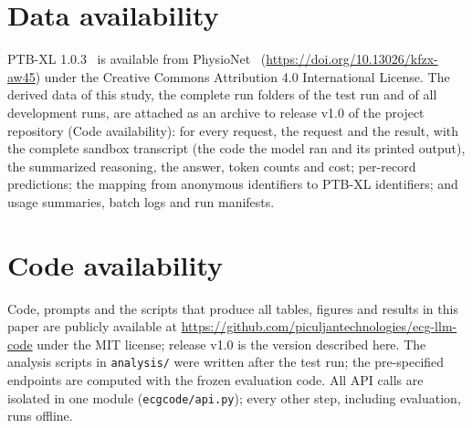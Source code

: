 
\section*{Data availability}
PTB-XL 1.0.3~\citep{Wagner2022physionet} is available from PhysioNet~\citep{Goldberger2000,Pollard2026}
(\url{https://doi.org/10.13026/kfzx-aw45}) under the Creative Commons Attribution 4.0 International License. The
derived data of this study, the complete run folders of the test run and of all development runs, are attached as an
archive to release v1.0 of the project repository (Code availability): for every request, the request and the result, with the complete sandbox transcript (the code the model ran
and its printed output), the summarized reasoning, the answer, token counts and cost; per-record predictions; the
mapping from anonymous identifiers to PTB-XL identifiers; and usage summaries, batch logs and run manifests.

\section*{Code availability}
Code, prompts and the scripts that produce all tables, figures and results in this paper are
publicly available at \url{https://github.com/piculjantechnologies/ecg-llm-code} under the MIT license;
release v1.0 is the version described here. The analysis
scripts in \texttt{analysis/} were written after the test run; the pre-specified endpoints are computed with the frozen
evaluation code. All API calls are isolated in one module (\texttt{ecgcode/api.py}); every other step, including
evaluation, runs offline.
